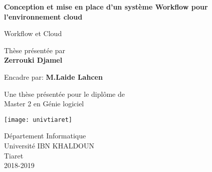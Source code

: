 \begin{titlepage}
    \begin{center}
        \vspace*{1cm}
 
        \Huge
        \textbf{Conception et mise en place d’un système Workflow  pour l'environnement cloud}
 
        \vspace{0.5cm}
        \LARGE
        Workflow et Cloud
 
        \vspace{1.5cm}
 Thèse présentée par\\
        \textbf{Zerrouki Djamel}
 
        \vspace{0.5cm}
 
      Encadre par:  \textbf{M.Laide Lahcen}
       
        \vfill
 
        Une thèse présentée pour le diplôme de \\
         Master 2  en Génie  logiciel
 
        \vspace{0.8cm}
 
        \texttt{[image: univtiaret]}
 
        \Large
        Département Informatique\\
        Université IBN KHALDOUN\\
        Tiaret\\
        2018-2019
 
    \end{center}
\end{titlepage}